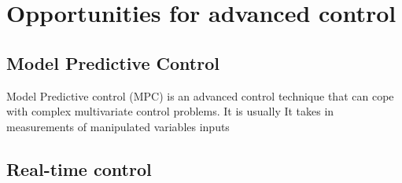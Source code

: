 \section{Opportunities for advanced control}

\subsection{Model Predictive Control}
Model Predictive control (MPC) is an advanced control technique that can cope with complex multivariate control problems. It is usually It takes in measurements of manipulated variables  inputs 

\subsection{Real-time control}